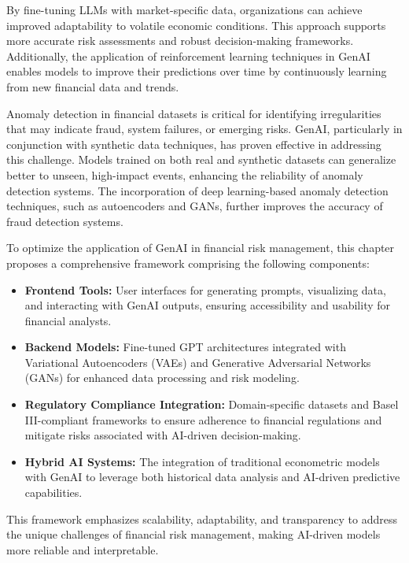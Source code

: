 \documentclass[a4paper,12pt]{scrbook}
\begin{document}
	By fine-tuning LLMs with market-specific data, organizations can achieve improved adaptability to volatile economic conditions. This approach supports more accurate risk assessments and robust decision-making frameworks. Additionally, the application of reinforcement learning techniques in GenAI enables models to improve their predictions over time by continuously learning from new financial data and trends.
	
	
	Anomaly detection in financial datasets is critical for identifying irregularities that may indicate fraud, system failures, or emerging risks. GenAI, particularly in conjunction with synthetic data techniques, has proven effective in addressing this challenge. Models trained on both real and synthetic datasets can generalize better to unseen, high-impact events, enhancing the reliability of anomaly detection systems. The incorporation of deep learning-based anomaly detection techniques, such as autoencoders and GANs, further improves the accuracy of fraud detection systems.
	
	
	To optimize the application of GenAI in financial risk management, this chapter proposes a comprehensive framework comprising the following components:
	
	\begin{itemize}
		\item \textbf{Frontend Tools:} User interfaces for generating prompts, visualizing data, and interacting with GenAI outputs, ensuring accessibility and usability for financial analysts.
		\item \textbf{Backend Models:} Fine-tuned GPT architectures integrated with Variational Autoencoders (VAEs) and Generative Adversarial Networks (GANs) for enhanced data processing and risk modeling.
		\item \textbf{Regulatory Compliance Integration:} Domain-specific datasets and Basel III-compliant frameworks to ensure adherence to financial regulations and mitigate risks associated with AI-driven decision-making.
		\item \textbf{Hybrid AI Systems:} The integration of traditional econometric models with GenAI to leverage both historical data analysis and AI-driven predictive capabilities.
	\end{itemize}
	
	This framework emphasizes scalability, adaptability, and transparency to address the unique challenges of financial risk management, making AI-driven models more reliable and interpretable.
	
\end{document}
